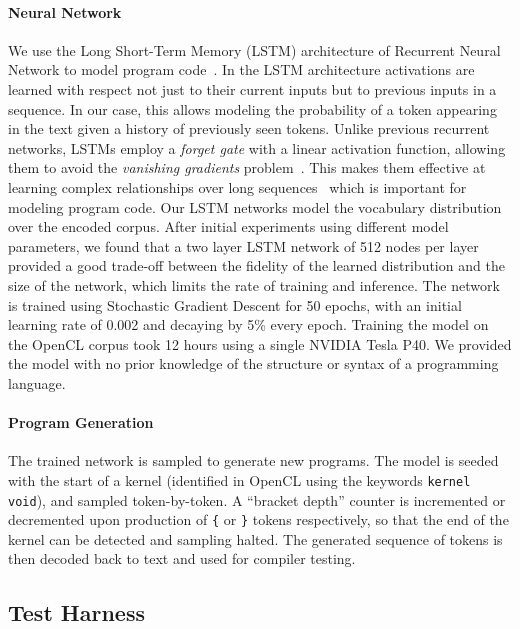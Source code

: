 \paragraph{Neural Network}

We use the Long Short-Term Memory (LSTM) architecture of Recurrent Neural
Network to model program code~\cite{Hochreiter1997}. In the LSTM architecture
activations are learned with respect not just to their current inputs but to
previous inputs in a sequence. In our case, this allows modeling the probability
of a token appearing in the text given a history of previously seen tokens.
Unlike previous recurrent networks, LSTMs employ a \emph{forget gate} with a
linear activation function, allowing them to avoid the \emph{vanishing
gradients} problem~\cite{Pacanu2013}. This makes them effective at learning
complex relationships over long sequences~\cite{Lipton2015} which is important
for modeling program code. Our LSTM networks model the vocabulary distribution
over the encoded corpus. After initial experiments using different model
parameters, we found that a two layer LSTM network of 512 nodes per layer
provided a good trade-off between the fidelity of the learned distribution and
the size of the network, which limits the rate of training and inference. The
network is trained using Stochastic Gradient Descent for 50 epochs, with an
initial learning rate of 0.002 and decaying by 5\% every epoch. Training the
model on the OpenCL corpus took 12 hours using a single NVIDIA Tesla P40. We
provided the model with no prior knowledge of the structure or syntax of a
programming language.

\paragraph{Program Generation}

The trained network is sampled to generate new programs. The model is seeded
with the start of a kernel (identified in OpenCL using the keywords
\texttt{kernel void}), and sampled token-by-token. A ``bracket depth'' counter
is incremented or decremented upon production of \texttt{\{} or \texttt{\}}
tokens respectively, so that the end of the kernel can be detected and sampling
halted. The generated sequence of tokens is then decoded back to text and used
for compiler testing.


\subsection{Test Harness\label{sec:test-harness}}

